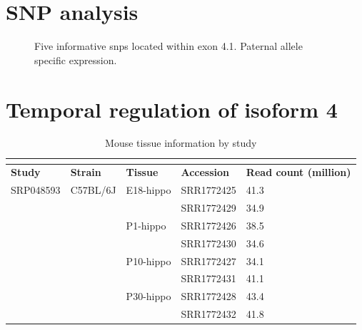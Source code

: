 \section{SNP analysis}
\begin{figure} [ht]
  \centering
  \caption{Five informative snps located within exon 4.1. Paternal allele specific expression.}
  \label{informative snps}
\end{figure}
\pagebreak
\section{Temporal regulation of isoform 4}
\begin{longtabu} {X[1,c]X[0.9,c]X[0.9,c]X[1,c]X[1.6,c]}
  \caption{Mouse tissue information by study}\\
  \label{tableC:1}\\
  \toprule
  \textbf{Study} & \textbf{Strain} & \textbf{Tissue} & \textbf{Accession} & \textbf{Read count (million)}\\
  \midrule
  \endhead
  SRP048593 & C57BL/6J     & E18-hippo   & SRR1772425 & 41.3\\
            &              &             & SRR1772429 & 34.9\\
            &              & P1-hippo    & SRR1772426 & 38.5\\
            &              &             & SRR1772430 & 34.6\\
            &              & P10-hippo   & SRR1772427 & 34.1\\
            &              &             & SRR1772431 & 41.1\\
            &              & P30-hippo   & SRR1772428 & 43.4\\
            &              &             & SRR1772432 & 41.8\\
  \bottomrule
\end{longtabu}

